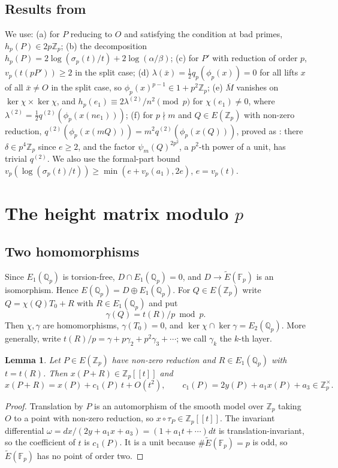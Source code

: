 \documentclass[11pt,a4paper]{amsart}
\newcommand{\Qp}{\mathbb{Q}_p}
\newcommand{\Zp}{\mathbb{Z}_p}
\newcommand{\Fp}{\mathbb{F}_p}
\newcommand{\Et}{\widetilde{E}}
\newcommand{\qp}{q_p}
\newcommand{\Mb}{\overline{M}}
\theoremstyle{plain}
\newtheorem{lemma}[theorem]{Lemma}
\theoremstyle{definition}
\theoremstyle{remark}
\begin{document}
\subsection{Results from \cite{P1}}\label{sec:recall}
We use: (a) for $P$ reducing to $O$ and satisfying the condition at bad primes, $h_p(P)\in2p\Zp$; (b) the decomposition $h_p(P)=2\log(\sigma_p(t)/t)+2\log(\alpha/\beta)$; (c) for $P'$ with reduction of order $p$, $v_p(t(pP'))\ge2$ in the split case; (d) $\lambda(\bar x)=\frac12\qp(\phi_p(x))=0$ for all lifts $x$ of all $\bar x\ne O$ in the split case, so $\phi_p(x)^{p-1}\in1+p^2\Zp$; (e) $\Mb$ vanishes on $\ker\chi\times\ker\chi$, and $h_p(e_1)\equiv2\lambda^{(2)}/n^2\pmod p$ for $\chi(e_1)\ne0$, where $\lambda^{(2)}=\frac12q^{(2)}(\phi_p(x(ne_1)))$; (f) for $p\nmid m$ and $Q\in E(\Zp)$ with non-zero reduction, $q^{(2)}(\phi_p(x(mQ)))=m^2q^{(2)}(\phi_p(x(Q)))$, proved as \cite[Prop.~6.1]{P1}: there $\delta\in p^4\Zp$ since $e\ge2$, and the factor $\psi_m(Q)^{2p^2}$, a $p^2$-th power of a unit, has trivial $q^{(2)}$. We also use the formal-part bound $v_p(\log(\sigma_p(t)/t))\ge\min(e+v_p(a_1),2e)$, $e=v_p(t)$.

\section{The height matrix modulo \texorpdfstring{$p$}{p}}\label{sec:K}

\subsection{Two homomorphisms}
Since $E_1(\Qp)$ is torsion-free, $D\cap E_1(\Qp)=0$, and $D\to\Et(\Fp)$ is an isomorphism. Hence $E(\Qp)=D\oplus E_1(\Qp)$. For $Q\in E(\Zp)$ write $Q=\chi(Q)T_0+R$ with $R\in E_1(\Qp)$ and put
\[
\gamma(Q)=t(R)/p\bmod p .
\]
Then $\chi,\gamma$ are homomorphisms, $\gamma(T_0)=0$, and $\ker\chi\cap\ker\gamma=E_2(\Qp)$. More generally, write $t(R)/p=\gamma+p\gamma_2+p^2\gamma_3+\cdots$; we call $\gamma_k$ the $k$-th layer.

\begin{lemma}\label{lem:firstdigit}
Let $P\in E(\Zp)$ have non-zero reduction and $R\in E_1(\Qp)$ with $t=t(R)$. Then $x(P+R)\in\Zp[[t]]$ and
\[
x(P+R)=x(P)+c_1(P)\,t+O(t^2),\qquad c_1(P)=2y(P)+a_1x(P)+a_3\in\Zp^\times .
\]
\end{lemma}

\begin{proof}
Translation by $P$ is an automorphism of the smooth model over $\Zp$ taking $O$ to a point with non-zero reduction, so $x\circ\tau_P\in\Zp[[t]]$. The invariant differential $\omega=dx/(2y+a_1x+a_3)=(1+a_1t+\cdots)dt$ is translation-invariant, so the coefficient of $t$ is $c_1(P)$. It is a unit because $\#\Et(\Fp)=p$ is odd, so $\Et(\Fp)$ has no point of order two.
\end{proof}
\end{document}
